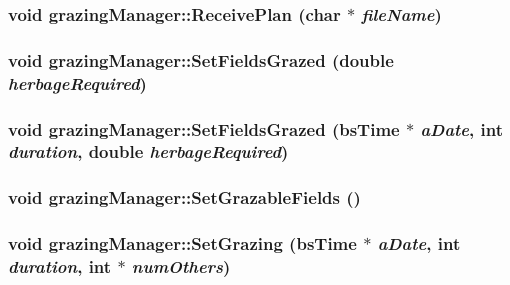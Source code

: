 \label{classgrazing_manager_a6f01332621905d316bb39c5f51169dd9}
\hypertarget{classgrazing_manager_a9f1919dad1cc77b8d229ed9b13a470d9}{
\subsubsection[{ReceivePlan}]{\setlength{\rightskip}{0pt plus 5cm}void grazingManager::ReceivePlan (char $\ast$ {\em fileName})}}
\label{classgrazing_manager_a9f1919dad1cc77b8d229ed9b13a470d9}
\hypertarget{classgrazing_manager_a27aa5c8d71dc9f1baca7d2209e63fe3b}{
\subsubsection[{SetFieldsGrazed}]{\setlength{\rightskip}{0pt plus 5cm}void grazingManager::SetFieldsGrazed (double {\em herbageRequired})}}
\label{classgrazing_manager_a27aa5c8d71dc9f1baca7d2209e63fe3b}
\hypertarget{classgrazing_manager_a602265e7f9501cf92722f06623365d89}{
\subsubsection[{SetFieldsGrazed}]{\setlength{\rightskip}{0pt plus 5cm}void grazingManager::SetFieldsGrazed ({\bf bsTime} $\ast$ {\em aDate}, \/  int {\em duration}, \/  double {\em herbageRequired})}}
\label{classgrazing_manager_a602265e7f9501cf92722f06623365d89}
\hypertarget{classgrazing_manager_a84c7728ec93315511d221ae456e997dd}{
\subsubsection[{SetGrazableFields}]{\setlength{\rightskip}{0pt plus 5cm}void grazingManager::SetGrazableFields ()}}
\label{classgrazing_manager_a84c7728ec93315511d221ae456e997dd}
\hypertarget{classgrazing_manager_af4d75fc52160ba2df1afa74db9727e5c}{
\subsubsection[{SetGrazing}]{\setlength{\rightskip}{0pt plus 5cm}void grazingManager::SetGrazing ({\bf bsTime} $\ast$ {\em aDate}, \/  int {\em duration}, \/  int $\ast$ {\em numOthers})}}

